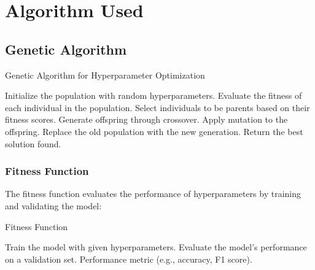 \section{Algorithm Used}

\subsection{Genetic Algorithm}
\begin{algorithm}[H]
\caption{Genetic Algorithm for Hyperparameter Optimization}
\begin{algorithmic}[1]
\STATE Initialize the population with random hyperparameters.
    \STATE Evaluate the fitness of each individual in the population.
    \STATE Select individuals to be parents based on their fitness scores.
    \STATE Generate offspring through crossover.
    \STATE Apply mutation to the offspring.
    \STATE Replace the old population with the new generation.
\ENDFOR
\STATE Return the best solution found.
\end{algorithmic}
\end{algorithm}

\subsubsection{Fitness Function}
The fitness function evaluates the performance of hyperparameters by training and validating the model:

\begin{algorithm}[H]
\caption{Fitness Function}
\begin{algorithmic}[1]
\STATE Train the model with given hyperparameters.
\STATE Evaluate the model's performance on a validation set.
\RETURN Performance metric (e.g., accuracy, F1 score).
\end{algorithmic}
\end{algorithm}


\newpage
